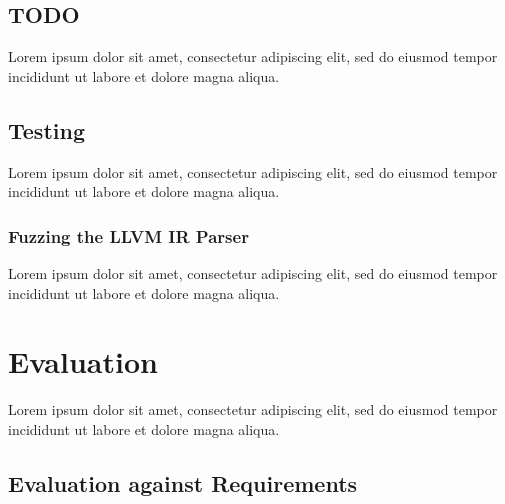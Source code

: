\documentclass[12pt, a4paper]{article}
\begin{document}

\subsection{TODO}

Lorem ipsum dolor sit amet, consectetur adipiscing elit, sed do eiusmod tempor incididunt ut labore et dolore magna aliqua.


\subsection{Testing}

Lorem ipsum dolor sit amet, consectetur adipiscing elit, sed do eiusmod tempor incididunt ut labore et dolore magna aliqua.


\subsubsection{Fuzzing the LLVM IR Parser}

Lorem ipsum dolor sit amet, consectetur adipiscing elit, sed do eiusmod tempor incididunt ut labore et dolore magna aliqua.



\section{Evaluation}

Lorem ipsum dolor sit amet, consectetur adipiscing elit, sed do eiusmod tempor incididunt ut labore et dolore magna aliqua.


\subsection{Evaluation against Requirements}
\end{document}
